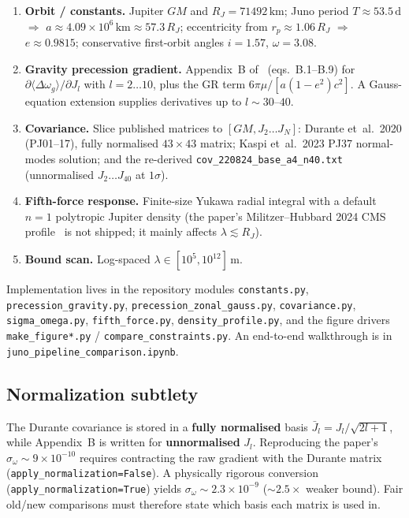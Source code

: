 \documentclass[11pt,a4paper]{article}
\begin{document}
\begin{enumerate}
  \item \textbf{Orbit / constants.}
        Jupiter \(GM\) and \(R_J=71492\,\mathrm{km}\); Juno period
        \(T\approx 53.5\,\mathrm{d}\) \(\Rightarrow\)
        \(a\approx 4.09\times10^{6}\,\mathrm{km}\approx 57.3\,R_J\);
        eccentricity from \(r_p\approx 1.06\,R_J\) \(\Rightarrow\)
        \(e\approx 0.9815\); conservative first-orbit angles \(i=1.57\),
        \(\omega=3.08\).
  \item \textbf{Gravity precession gradient.}
        Appendix~B of~\cite{Singh2025} (eqs.~B.1--B.9) for
        \(\partial\langle\Delta\omega_g\rangle/\partial J_l\) with
        \(l=2\ldots10\), plus the GR term
        \(6\pi\mu/[a(1-e^2)c^2]\). A Gauss-equation extension supplies
        derivatives up to \(l\sim 30\)--\(40\).
  \item \textbf{Covariance.}
        Slice published matrices to \([GM,J_2\ldots J_N]\):
        Durante et~al.\ 2020 (PJ01--17), fully normalised \(43\times43\)
        matrix; Kaspi et~al.\ 2023 PJ37 normal-modes solution; and the
        re-derived \texttt{cov\_220824\_base\_a4\_n40.txt} (unnormalised
        \(J_2\ldots J_{40}\) at \(1\sigma\)).
  \item \textbf{Fifth-force response.}
        Finite-size Yukawa radial integral with a default \(n=1\) polytropic
        Jupiter density (the paper's Militzer--Hubbard 2024 CMS
        profile~\cite{Militzer2024} is not shipped; it mainly affects
        \(\lambda\lesssim R_J\)).
  \item \textbf{Bound scan.}
        Log-spaced \(\lambda\in[10^{5},10^{12}]\,\mathrm{m}\).
\end{enumerate}

Implementation lives in the repository modules
\texttt{constants.py}, \texttt{precession\_gravity.py},
\texttt{precession\_zonal\_gauss.py}, \texttt{covariance.py},
\texttt{sigma\_omega.py}, \texttt{fifth\_force.py},
\texttt{density\_profile.py}, and the figure drivers
\texttt{make\_figure*.py} / \texttt{compare\_constraints.py}. An end-to-end
walkthrough is in \texttt{juno\_pipeline\_comparison.ipynb}.

\subsection{Normalization subtlety}

The Durante covariance is stored in a \textbf{fully normalised} basis
\(\bar J_l=J_l/\sqrt{2l+1}\), while Appendix~B is written for
\textbf{unnormalised} \(J_l\). Reproducing the paper's
\(\sigma_\omega\sim 9\times10^{-10}\) requires contracting the raw gradient
with the Durante matrix (\texttt{apply\_normalization=False}). A physically
rigorous conversion (\texttt{apply\_normalization=True}) yields
\(\sigma_\omega\sim 2.3\times10^{-9}\) (\(\sim 2.5\times\) weaker bound). Fair
old/new comparisons must therefore state which basis each matrix is used in.
\end{document}
